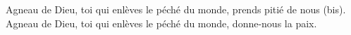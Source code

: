 Agneau de Dieu, toi qui enlèves le péché du monde, prends pitié de nous (bis).\\
Agneau de Dieu, toi qui enlèves le péché du monde, donne-nous la paix.
